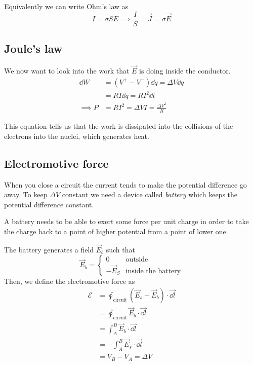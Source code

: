 \documentclass[12pt]{extarticle}
\begin{document}
Equivalently we can write Ohm's law as
\begin{equation}
	I = \sigma S E \implies \frac{I}{S} = \vec J = \sigma \vec E
\end{equation}

\subsection{Joule's law}

We now want to look into the work that $\vec E$ is doing inside the conductor.
\begin{align}
	\dd W      & = (V^+ - V^-) \dd q = \Delta V \dd q          \\
	           & = R I \dd q = R I^2 \dd t                     \\
	\implies P & = R I ^ 2 = \Delta V I = \frac{\Delta V^2}{R}
\end{align}

This equation tells us that the work is dissipated into the collisions of the electrons into the nuclei,
which generates heat.

\subsection{Electromotive force}

When you close a circuit the current tends to make the potential difference go away.
To keep $\Delta V$ constant we need a device called \emph{battery} which keeps the potential difference constant.

A battery needs to be able to exert some force per unit charge in order to
take the charge back to a point of higher potential from a point of lower one.

\begin{figure}[H]
	\centering
	
\end{figure}

The battery generates a field $\vec E_b$ such that
\begin{equation}
	\vec E_b = \begin{cases}
		0         & \text{outside}            \\
		-\vec E_S & \text{inside the battery}
	\end{cases}
\end{equation}
Then, we define the electromotive force as
\begin{align}
	\mathcal{E} & = \oint_\text{circuit} (\vec E_s + \vec E_b) \cdot \vec{\dd l} \\
	            & = \oint_\text{circuit} \vec E_b \cdot \vec{\dd l}              \\
	            & = \int_{A}^{B} \vec E_b \cdot \vec{\dd l }                     \\
	            & = - \int_A^B \vec E_s \cdot \vec{\dd l}                        \\
	            & = V_B - V_A = \Delta V
\end{align}
\end{document}
